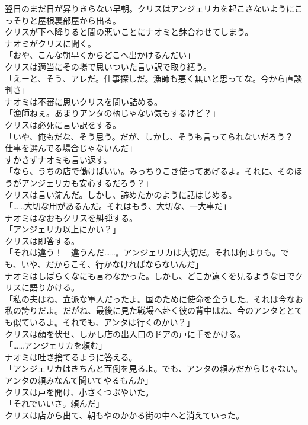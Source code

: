 \documentclass[b5j,10pt,openany]{jsbook}
\begin{document}
翌日のまだ日が昇りきらない早朝。クリスはアンジェリカを起こさないようにこっそりと屋根裏部屋から出る。\\クリスが下へ降りると間の悪いことにナオミと鉢合わせてしまう。\\ナオミがクリスに聞く。\\「おや、こんな朝早くからどこへ出かけるんだい」\\クリスは適当にその場で思いついた言い訳で取り繕う。\\「えーと、そう、アレだ。仕事探しだ。漁師も悪く無いと思ってな。今から直談判さ」\\ナオミは不審に思いクリスを問い詰める。\\「漁師ねぇ。あまりアンタの柄じゃない気もするけど？」\\クリスは必死に言い訳をする。\\「いや、俺もだな、そう思う。だが、しかし、そうも言ってられないだろう？　仕事を選んでる場合じゃないんだ」\\すかさずナオミも言い返す。\\「なら、うちの店で働けばいい。みっちりこき使ってあげるよ。それに、そのほうがアンジェリカも安心するだろう？」\\クリスは言い淀んだ。しかし、諦めたかのように話はじめる。\\「\ldots{}\ldots{}大切な用があるんだ。それはもう、大切な、一大事だ」\\ナオミはなおもクリスを糾弾する。\\「アンジェリカ以上にかい？」\\クリスは即答する。\\「それは違う！　違うんだ\ldots{}\ldots{}。アンジェリカは大切だ。それは何よりも。でも、いや、だからこそ、行かなければならないんだ」\\ナオミはしばらくなにも言わなかった。しかし、どこか遠くを見るような目でクリスに語りかける。\\「私の夫はね、立派な軍人だったよ。国のために使命を全うした。それは今なお私の誇りだよ。だがね、最後に見た戦場へ赴く彼の背中はね、今のアンタととても似ているよ。それでも、アンタは行くのかい？」\\クリスは顔を伏せ、しかし店の出入口のドアの戸に手をかける。\\「\ldots{}\ldots{}アンジェリカを頼む」\\ナオミは吐き捨てるように答える。\\「アンジェリカはきちんと面倒を見るよ。でも、アンタの頼みだからじゃない。アンタの頼みなんて聞いてやるもんか」\\クリスは戸を開け、小さくつぶやいた。\\「それでいいさ。頼んだ」\\クリスは店から出て、朝もやのかかる街の中へと消えていった。
\end{document}
